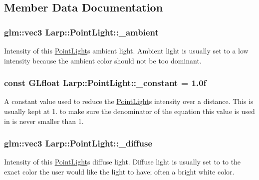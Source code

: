 \subsection{Member Data Documentation}
\subsubsection[{\texorpdfstring{\+\_\+ambient}{_ambient}}]{\setlength{\rightskip}{0pt plus 5cm}glm\+::vec3 Larp\+::\+Point\+Light\+::\+\_\+ambient}\hypertarget{structLarp_1_1PointLight_ad4f86b57c7ef0d914edb7dd1c234010f}{}\label{structLarp_1_1PointLight_ad4f86b57c7ef0d914edb7dd1c234010f}
Intensity of this \hyperlink{structLarp_1_1PointLight}{Point\+Light}\textquotesingle{}s ambient light. Ambient light is usually set to a low intensity because the ambient color should not be too dominant. 
\subsubsection[{\texorpdfstring{\+\_\+constant}{_constant}}]{\setlength{\rightskip}{0pt plus 5cm}const G\+Lfloat Larp\+::\+Point\+Light\+::\+\_\+constant = 1.\+0f\hspace{0.3cm}{\ttfamily [static]}}\hypertarget{structLarp_1_1PointLight_a6ee45a0090242c188ea24d239a7bc029}{}\label{structLarp_1_1PointLight_a6ee45a0090242c188ea24d239a7bc029}
A constant value used to reduce the \hyperlink{structLarp_1_1PointLight}{Point\+Light}\textquotesingle{}s intensity over a distance. This is usually kept at 1. to make sure the denominator of the equation this value is used in is never smaller than 1. 
\subsubsection[{\texorpdfstring{\+\_\+diffuse}{_diffuse}}]{\setlength{\rightskip}{0pt plus 5cm}glm\+::vec3 Larp\+::\+Point\+Light\+::\+\_\+diffuse}\hypertarget{structLarp_1_1PointLight_a84af06eeff58f67ffc14754b9ad60dbe}{}\label{structLarp_1_1PointLight_a84af06eeff58f67ffc14754b9ad60dbe}
Intensity of this \hyperlink{structLarp_1_1PointLight}{Point\+Light}\textquotesingle{}s diffuse light. Diffuse light is usually set to to the exact color the user would like the light to have; often a bright white color. 
